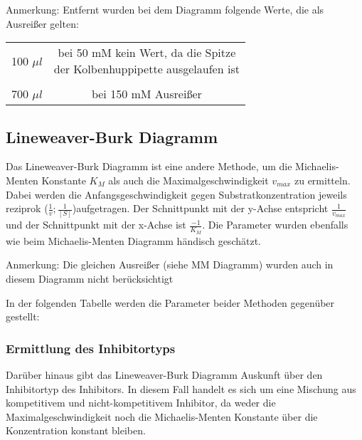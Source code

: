 
Anmerkung: Entfernt wurden bei dem Diagramm folgende Werte, die als Ausreißer gelten: \\
\begin{center}
  \begin{tabular}{cc}
    100 $\mu l$ & \makecell{bei 50 mM kein Wert, da die Spitze \\ der Kolbenhuppipette ausgelaufen ist} \\
    & \\
    700 $\mu l$ & bei 150 mM Ausreißer
  \end{tabular}
  \subsection{Lineweaver-Burk Diagramm}
\end{center}

Das Lineweaver-Burk Diagramm ist eine andere Methode, um die Michaelis-Menten Konstante $K_M$ als auch die Maximalgeschwindigkeit $v_{max}$ zu ermitteln. Dabei werden die Anfangsgeschwindigkeit gegen Substratkonzentration jeweils reziprok ($ \frac{1}{v};\frac{1}{[S]} $)aufgetragen.
Der Schnittpunkt mit der y-Achse entspricht $\frac{1}{v_{max}}$ und der Schnittpunkt mit der x-Achse ist $\frac{-1}{K_M}$. Die Parameter wurden ebenfalls wie beim Michaelis-Menten Diagramm händisch geschätzt. 

Anmerkung: Die gleichen Ausreißer (siehe MM Diagramm) wurden auch in diesem Diagramm nicht berücksichtigt


In der folgenden Tabelle werden die Parameter beider Methoden gegenüber gestellt:



\subsubsection{Ermittlung des Inhibitortyps}

Darüber hinaus gibt das Lineweaver-Burk Diagramm Auskunft über den Inhibitortyp des Inhibitors. 
In diesem Fall handelt es sich um eine Mischung aus kompetitivem und nicht-kompetitivem Inhibitor, da weder die Maximalgeschwindigkeit noch die Michaelis-Menten Konstante über die Konzentration konstant bleiben.

